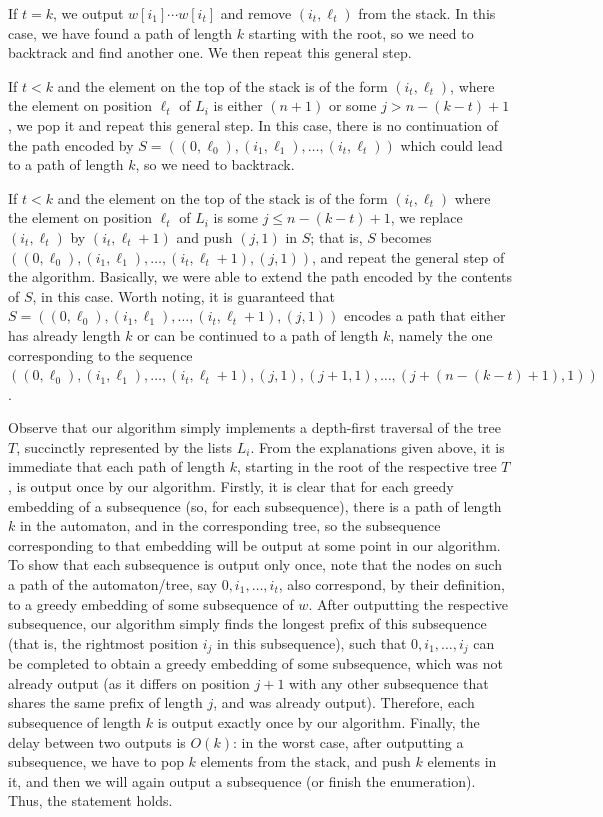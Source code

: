 \documentclass[10pt,a4paper]{amsart}
\makeatletter
\theoremstyle{plain}
\theoremstyle{definition}
\renewenvironment{proof}[1][\proofname]{\par
  \pushQED{}%
  \normalfont \topsep6\p@\@plus6\p@\relax
  \trivlist
  \item[\hskip\labelsep\itshape #1\@addpunct{.}]\ignorespaces
}{%
  \popQED\endtrivlist\@endpefalse
}
\makeatother
\begin{document}
\begin{proof}
If $t=k$, we output $w[i_1]\cdots w[i_t]$ and remove $(i_t, \ell_t)$ from the stack. In this case, we have found a path of length $k$ starting with the root, so we need to backtrack and find another one. We then repeat this general step.  

If $t<k$ and the element on the top of the stack is of the form $(i_t,\ell_t)$, where the element on position $\ell_t$ of $L_i$ is either $(n+1)$ or some $j>n-(k-t)+1$, we pop it and repeat this general step. In this case, there is no continuation of the path encoded by $S=((0,\ell_0), (i_1, \ell_1), \ldots, (i_t, \ell_t))$ which could lead to a path of length $k$, so we need to backtrack.

If $t<k$ and the element on the top of the stack is of the form $(i_t,\ell_t)$ where the element on position $\ell_t$ of $L_i$ is some $j\leq n-(k-t)+1$, we replace $(i_t, \ell_t)$ by $(i_t, \ell_t+1)$ and push $(j,1)$ in $S$; that is, $S$ becomes $((0,\ell_0), (i_1, \ell_1), \ldots, (i_t, \ell_t+1), (j,1))$, and repeat the general step of the algorithm. Basically, we were able to extend the path encoded by the contents of $S$, in this case. Worth noting, it is guaranteed that $S=((0,\ell_0), (i_1, \ell_1), \ldots, (i_t, \ell_t+1), (j,1))$ encodes a path that either has already length $k$ or can be continued to a path of length $k$, namely the one corresponding to the sequence $((0,\ell_0), (i_1, \ell_1), \ldots, (i_t, \ell_t+1), (j,1), (j+1,1),\ldots, (j+(n-(k-t)+1), 1))$. 

Observe that our algorithm simply implements a depth-first traversal of the tree $T$,  succinctly represented by the lists $L_i$. 
From the explanations given above, it is immediate that each path of length $k$, starting in the root of the respective tree $T$, is output once by our algorithm. Firstly, it is clear that for each greedy embedding of a subsequence (so, for each subsequence), there is a path of length $k$ in the automaton, and in the corresponding tree, so the subsequence corresponding to that embedding will be output at some point in our algorithm. To show that each subsequence is output only once, note that the nodes on such a path of the automaton/tree, say $0,i_1,  \ldots, i_t$, also correspond, by their definition, to a greedy embedding of some subsequence of $w$. After outputting the respective subsequence, our algorithm simply finds the longest prefix of this subsequence (that is, the rightmost position $i_j$ in this subsequence), such that $0,i_1,  \ldots, i_j$ can be completed to obtain a greedy embedding of some subsequence, which was not already output (as it differs on position $j+1$ with any other subsequence that shares the same prefix of length $j$, and was already output). Therefore, each subsequence of length $k$ is output exactly once by our algorithm. Finally, the delay between two outputs is $O(k)$: in the worst case, after outputting a subsequence, we have to pop $k$ elements from the stack, and push $k$ elements in it, and then we will again output a subsequence (or finish the enumeration). Thus, the statement holds. 
\end{proof}
\end{document}
